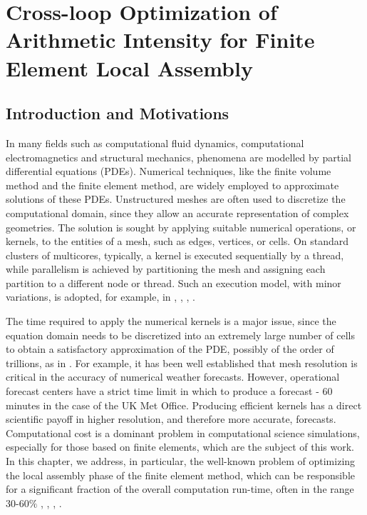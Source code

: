 \chapter{Cross-loop Optimization of Arithmetic Intensity for Finite Element Local Assembly}
\label{ch:coffee}

\section{Introduction and Motivations}
In many fields such as computational fluid dynamics, computational electromagnetics and structural mechanics, phenomena are modelled by partial differential equations (PDEs). Numerical techniques, like the finite volume method and the finite element method, are widely employed to approximate solutions of these PDEs. Unstructured meshes are often used to discretize the computational domain, since they allow an accurate representation of complex geometries. The solution is sought by applying suitable numerical operations, or
kernels, to the entities of a mesh, such as edges, vertices, or cells. On standard clusters of multicores, typically, a kernel is executed sequentially by a thread, while parallelism is achieved by partitioning the mesh and assigning each partition to a different node or thread. Such an execution model, with minor variations, is adopted, for example, in \cite{pyop2isc}, \cite{Fenics}, \cite{fluidity_manual_v4}, \cite{lizst}.

The time required to apply the numerical kernels is a major issue, since the equation domain needs to be discretized into an extremely large number of cells to obtain a satisfactory approximation of the PDE, possibly of the order of trillions, as in \cite{Rossinelli2013}. For example, it has been well established that mesh resolution is critical in the accuracy of numerical weather forecasts. However, operational forecast centers have a strict time limit in which to produce a forecast - 60 minutes in the case of the UK Met Office. Producing efficient kernels has a direct scientific payoff in higher resolution, and therefore more accurate, forecasts. Computational cost is a dominant problem in computational science simulations, especially for those based on finite elements, which are the subject of this work. In this chapter, we address, in particular, the well-known problem of optimizing the local assembly phase of the finite element method, which can be responsible for a significant fraction of the overall computation run-time, often in the range 30-60$\%$ \citep{francis}, \citep{quadrature-olegaard}, \citep{petsc-integration-gpu}, \citep{tensor-kirby}. 


